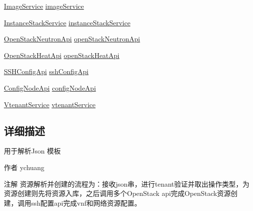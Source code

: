 \begin{DoxyCompactItemize}
\item 
\mbox{\hyperlink{classcom_1_1example_1_1demo_1_1service_1_1_image_service}{Image\+Service}} \mbox{\hyperlink{classcom_1_1example_1_1demo_1_1templates_1_1_json_template_lexer_af0496521f5665ea1b3f771453a8db0a8}{image\+Service}}
\item 
\mbox{\hyperlink{classcom_1_1example_1_1demo_1_1service_1_1_instance_stack_service}{Instance\+Stack\+Service}} \mbox{\hyperlink{classcom_1_1example_1_1demo_1_1templates_1_1_json_template_lexer_aa9184c7c594abf5597835feb346f71eb}{instance\+Stack\+Service}}
\item 
\mbox{\hyperlink{classcom_1_1example_1_1demo_1_1openstack_1_1_open_stack_neutron_api}{Open\+Stack\+Neutron\+Api}} \mbox{\hyperlink{classcom_1_1example_1_1demo_1_1templates_1_1_json_template_lexer_a35b6bbebc2881ab35290a6e73633acde}{open\+Stack\+Neutron\+Api}}
\item 
\mbox{\hyperlink{classcom_1_1example_1_1demo_1_1openstack_1_1_open_stack_heat_api}{Open\+Stack\+Heat\+Api}} \mbox{\hyperlink{classcom_1_1example_1_1demo_1_1templates_1_1_json_template_lexer_ad05aac9dfc3565a1f0f552b775f1bde9}{open\+Stack\+Heat\+Api}}
\item 
\mbox{\hyperlink{classcom_1_1example_1_1demo_1_1configplatform_1_1_s_s_h_config_api}{S\+S\+H\+Config\+Api}} \mbox{\hyperlink{classcom_1_1example_1_1demo_1_1templates_1_1_json_template_lexer_a3ae7ee54cee1855a4a08c53ad52e1325}{ssh\+Config\+Api}}
\item 
\mbox{\hyperlink{classcom_1_1example_1_1demo_1_1configplatform_1_1_config_node_api}{Config\+Node\+Api}} \mbox{\hyperlink{classcom_1_1example_1_1demo_1_1templates_1_1_json_template_lexer_a46f52b0aa5e1ad359c815dc4fbb86526}{config\+Node\+Api}}
\item 
\mbox{\hyperlink{classcom_1_1example_1_1demo_1_1service_1_1_vtenant_service}{Vtenant\+Service}} \mbox{\hyperlink{classcom_1_1example_1_1demo_1_1templates_1_1_json_template_lexer_ab3064daa9ed5931e3e58cf1821044624}{vtenant\+Service}}
\end{DoxyCompactItemize}


\subsection{详细描述}
用于解析\+Json 模板 

\begin{DoxyAuthor}{作者}
ychuang 
\end{DoxyAuthor}
\begin{DoxyNote}{注解}
资源解析并创建的流程为：接收json串，进行tenant验证并取出操作类型，为资源创建则先将资源入库，之后调用多个\+Open\+Stack api完成\+Open\+Stack资源创建，调用ssh配置api完成vnf和网络资源配置。 
\end{DoxyNote}


